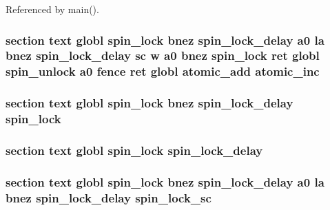 Referenced by main().

\hypertarget{riscv_2atomic_8S_ad5a03cd35d090a23a5070103775a1095}{
\subsubsection[{atomic\-\_\-inc}]{\setlength{\rightskip}{0pt plus 5cm}section text globl {\bf spin\-\_\-lock} {\bf bnez} {\bf spin\-\_\-lock\-\_\-delay} {\bf a0} {\bf la} {\bf bnez} {\bf spin\-\_\-lock\-\_\-delay} {\bf sc} w {\bf a0} {\bf bnez} {\bf spin\-\_\-lock} ret globl {\bf spin\-\_\-unlock} {\bf a0} fence ret globl {\bf atomic\-\_\-add} atomic\-\_\-inc}}\label{riscv_2atomic_8S_ad5a03cd35d090a23a5070103775a1095}
\hypertarget{riscv_2atomic_8S_a3e45f57ebbb323b69fb4d0b22eae8497}{
\subsubsection[{spin\-\_\-lock}]{\setlength{\rightskip}{0pt plus 5cm}section text globl spin\-\_\-lock {\bf bnez} {\bf spin\-\_\-lock\-\_\-delay} spin\-\_\-lock}}\label{riscv_2atomic_8S_a3e45f57ebbb323b69fb4d0b22eae8497}
\hypertarget{riscv_2atomic_8S_ac58f8c5ceac726ecc3bcc7f0360b5cfa}{
\subsubsection[{spin\-\_\-lock\-\_\-delay}]{\setlength{\rightskip}{0pt plus 5cm}section text globl {\bf spin\-\_\-lock} spin\-\_\-lock\-\_\-delay}}\label{riscv_2atomic_8S_ac58f8c5ceac726ecc3bcc7f0360b5cfa}
\hypertarget{riscv_2atomic_8S_ad80941180cbdc552c8ea89350d1d2fd0}{
\subsubsection[{spin\-\_\-lock\-\_\-sc}]{\setlength{\rightskip}{0pt plus 5cm}section text globl {\bf spin\-\_\-lock} {\bf bnez} {\bf spin\-\_\-lock\-\_\-delay} {\bf a0} {\bf la} {\bf bnez} {\bf spin\-\_\-lock\-\_\-delay} spin\-\_\-lock\-\_\-sc}}\label{riscv_2atomic_8S_ad80941180cbdc552c8ea89350d1d2fd0}
